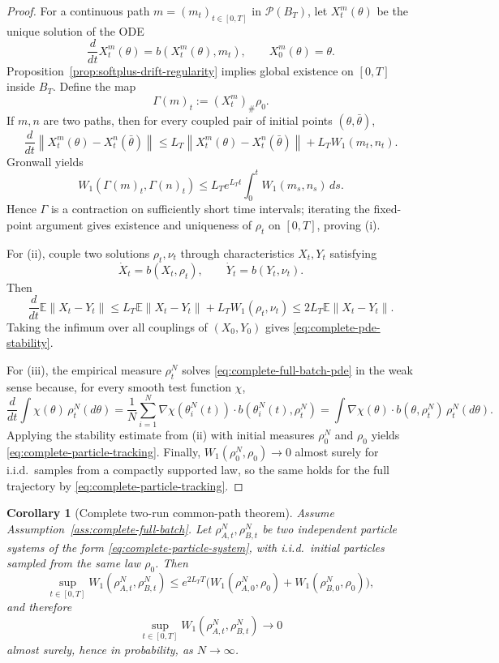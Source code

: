 \documentclass[11pt]{article}
\newtheorem{corollary}[theorem]{Corollary}
\theoremstyle{definition}
\newcommand{\E}{\mathbb{E}}
\newcommand{\norm}[1]{\left\lVert #1 \right\rVert}
\begin{document}
\begin{proof}
For a continuous path $m=(m_t)_{t\in[0,T]}$ in $\mathcal P(B_T)$, let
$X_t^m(\theta)$ be the unique solution of the ODE
\[
  \frac{d}{dt}X_t^m(\theta)=b(X_t^m(\theta),m_t),
  \qquad
  X_0^m(\theta)=\theta.
\]
Proposition~\ref{prop:softplus-drift-regularity} implies global existence on
$[0,T]$ inside $B_T$. Define the map
\[
  \Gamma(m)_t := (X_t^m)_\#\rho_0.
\]
If $m,n$ are two paths, then for every coupled pair of initial points
$(\theta,\bar\theta)$,
\[
  \frac{d}{dt}
  \norm{X_t^m(\theta)-X_t^n(\bar\theta)}
  \le
  L_T\norm{X_t^m(\theta)-X_t^n(\bar\theta)}
  +
  L_T W_1(m_t,n_t).
\]
Gronwall yields
\[
  W_1(\Gamma(m)_t,\Gamma(n)_t)
  \le
  L_T e^{L_T t}\int_0^t W_1(m_s,n_s)\,ds.
\]
Hence $\Gamma$ is a contraction on sufficiently short time intervals; iterating
the fixed-point argument gives existence and uniqueness of $\rho_t$ on $[0,T]$,
proving (i).

For (ii), couple two solutions $\rho_t,\nu_t$ through characteristics
$X_t,Y_t$ satisfying
\[
  \dot X_t=b(X_t,\rho_t),
  \qquad
  \dot Y_t=b(Y_t,\nu_t).
\]
Then
\[
  \frac{d}{dt}\E\norm{X_t-Y_t}
  \le
  L_T \E\norm{X_t-Y_t} + L_T W_1(\rho_t,\nu_t)
  \le
  2L_T \E\norm{X_t-Y_t}.
\]
Taking the infimum over all couplings of $(X_0,Y_0)$ gives
\eqref{eq:complete-pde-stability}.

For (iii), the empirical measure $\rho_t^N$ solves
\eqref{eq:complete-full-batch-pde} in the weak sense because, for every smooth
test function $\chi$,
\[
  \frac{d}{dt}\int \chi(\theta)\,\rho_t^N(d\theta)
  =
  \frac1N\sum_{i=1}^N \nabla\chi(\theta_i^N(t))\cdot
  b(\theta_i^N(t),\rho_t^N)
  =
  \int \nabla\chi(\theta)\cdot b(\theta,\rho_t^N)\,\rho_t^N(d\theta).
\]
Applying the stability estimate from (ii) with initial measures $\rho_0^N$ and
$\rho_0$ yields \eqref{eq:complete-particle-tracking}. Finally,
$W_1(\rho_0^N,\rho_0)\to 0$ almost surely for i.i.d.\ samples from a compactly
supported law, so the same holds for the full trajectory by
\eqref{eq:complete-particle-tracking}.
\end{proof}

\begin{corollary}[Complete two-run common-path theorem]
\label{cor:complete-two-run}
Assume Assumption~\ref{ass:complete-full-batch}. Let
$\rho_{A,t}^N,\rho_{B,t}^N$ be two independent particle systems of the form
\eqref{eq:complete-particle-system}, with i.i.d.\ initial particles sampled
from the same law $\rho_0$. Then
\begin{equation}
  \sup_{t\in[0,T]}W_1(\rho_{A,t}^N,\rho_{B,t}^N)
  \le
  e^{2L_T T}
  \Big(
    W_1(\rho_{A,0}^N,\rho_0)+W_1(\rho_{B,0}^N,\rho_0)
  \Big),
  \label{eq:complete-two-run}
\end{equation}
and therefore
\[
  \sup_{t\in[0,T]}W_1(\rho_{A,t}^N,\rho_{B,t}^N)\to 0
\]
almost surely, hence in probability, as $N\to\infty$.
\end{corollary}
\end{document}
